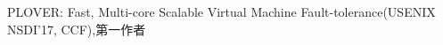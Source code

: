 \cventry
{} %
{PLOVER: Fast, Multi-core Scalable Virtual Machine Fault-tolerance(USENIX NSDI'17, CCF),第一作者} %
{} %
{} %
{ %
}

